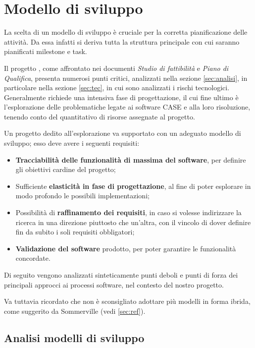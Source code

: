 \section{Modello di sviluppo} \label{sec:modello}

	La scelta di un modello di sviluppo è cruciale per la corretta pianificazione delle attività. Da essa infatti si deriva tutta la struttura principale con cui saranno pianificati milestone e task.

	Il progetto {\proj}, come affrontato nei documenti \emph{Studio di fattibilità} e \emph{Piano di Qualifica}, presenta numerosi punti critici, analizzati nella sezione {\ref{sec:analisi}}, in particolare nella sezione {\ref{sec:tec}}, in cui sono analizzati i rischi tecnologici. Generalmente {\proj} richiede una intensiva fase di progettazione, il cui fine ultimo è l'esplorazione delle problematiche legate ai software CASE e alla loro risoluzione, tenendo conto del quantitativo di risorse assegnate al progetto. %

	Un progetto dedito all'esplorazione va supportato con un adeguato modello di sviluppo; esso deve avere i seguenti requisiti:

	\begin{itemize}
		\item \textbf{Tracciabilità delle funzionalità di massima del software}, per definire gli obiettivi cardine del progetto;
		\item Sufficiente \textbf{elasticità in fase di progettazione}, al fine di poter esplorare in modo profondo le possibili implementazioni;
		\item Possibilità di \textbf{raffinamento dei requisiti}, in caso si volesse indirizzare la ricerca in una direzione piuttosto che un'altra, con il vincolo di dover definire fin da subito i soli requisiti obbligatori;
		\item \textbf{Validazione del software} prodotto, per poter garantire le funzionalità concordate.
	\end{itemize}

	Di seguito vengono analizzati sinteticamente punti deboli e punti di forza dei principali approcci ai processi software, nel contesto del nostro progetto.
	
	Va tuttavia ricordato che non è sconsigliato adottare più modelli in forma ibrida, come suggerito da Sommerville (vedi \ref{sec:ref}).

	\subsection{Analisi modelli di sviluppo}

